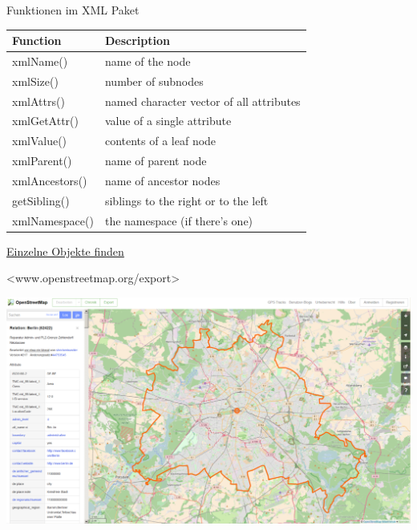 \documentclass[ignorenonframetext,]{beamer}
\begin{document}
\begin{frame}{Funktionen im XML Paket}

\begin{longtable}[]{@{}ll@{}}
\toprule
Function & Description\tabularnewline
\midrule
\endhead
xmlName() & name of the node\tabularnewline
xmlSize() & number of subnodes\tabularnewline
xmlAttrs() & named character vector of all attributes\tabularnewline
xmlGetAttr() & value of a single attribute\tabularnewline
xmlValue() & contents of a leaf node\tabularnewline
xmlParent() & name of parent node\tabularnewline
xmlAncestors() & name of ancestor nodes\tabularnewline
getSibling() & siblings to the right or to the left\tabularnewline
xmlNamespace() & the namespace (if there's one)\tabularnewline
\bottomrule
\end{longtable}

\end{frame}

\begin{frame}{\href{http://www.openstreetmap.org/export}{Einzelne
Objekte finden}}

\textless{}www.openstreetmap.org/export\textgreater{}

\includegraphics{figure/admgrBer.PNG}

\end{frame}
\end{document}
